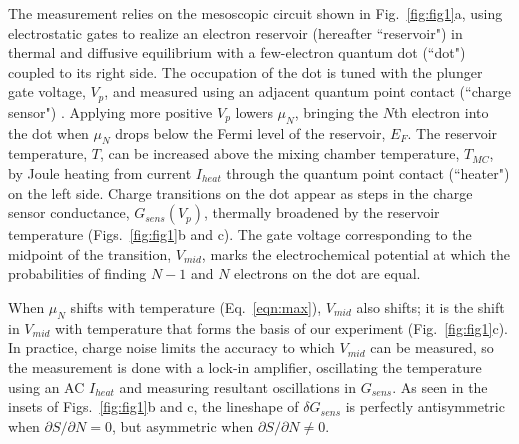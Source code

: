 \documentclass[twocolumn,showpacs,amsmath,amssymb,prl,aps,superscriptaddress]{revtex4-1}
\begin{document}
The measurement relies on the mesoscopic circuit shown in Fig.~\ref{fig:fig1}a, using electrostatic gates to realize an electron reservoir (hereafter ``reservoir") in thermal and diffusive equilibrium with a few-electron quantum dot (``dot") coupled to its right side.  The occupation of the dot is tuned with the plunger gate voltage, $V_p$, and measured using an adjacent quantum point contact (``charge sensor") \cite{Field1993, Staring2007, Thierschmann2015}.  Applying more positive $V_p$ lowers $\mu_N$,  bringing the $N$th electron into the dot when $\mu_{N}$ drops below the Fermi level of the reservoir, $E_F$. The reservoir temperature, $T$, can be increased above the mixing chamber temperature, $T_{MC}$, by Joule heating from current $I_{heat}$ through the quantum point contact (``heater") on the left side.   Charge transitions on the dot appear as steps in the charge sensor conductance, $G_{sens}(V_p)$, thermally broadened by the reservoir temperature (Figs.~\ref{fig:fig1}b and c).  The gate voltage corresponding to the midpoint of the transition, $V_{mid}$, marks the electrochemical potential at which the probabilities of finding $N-1$ and $N$ electrons on the dot are equal.

When $\mu_N$ shifts with temperature (Eq.~\ref{eqn:max}), $V_{mid}$ also shifts; it is the shift in $V_{mid}$ with temperature that forms the basis of our experiment (Fig.~\ref{fig:fig1}c).  In practice, charge noise limits the accuracy to which $V_{mid}$ can be measured, so the measurement is done with a lock-in amplifier, oscillating the temperature using an AC $I_{heat}$ and measuring resultant oscillations in $G_{sens}$.  As seen in the insets of Figs.~\ref{fig:fig1}b and c, the lineshape of $\delta G_{sens}$ is perfectly antisymmetric when $\partial S/\partial N=0$, but asymmetric when $\partial S/\partial N \neq 0$.
\end{document}

